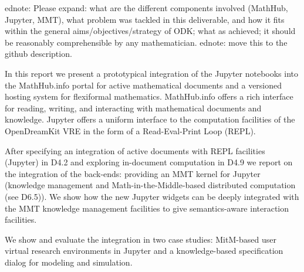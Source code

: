 ednote: Please expand: what are the different components involved (MathHub, Jupyter, MMT), what problem was tackled in this deliverable, and how it fits within the general aims/objectives/strategy of ODK; what as achieved; it should be reasonably comprehensible by any mathematician.
ednote: move this to the github description.

In this report we present a prototypical integration of the Jupyter notebooks into the MathHub.info portal for active mathematical documents and a versioned hosting system for flexiformal mathematics.
MathHub.info offers a rich interface for reading, writing, and interacting with mathematical documents and knowledge.
Jupyter offers a uniform interface to the computation facilities of the OpenDreamKit VRE in the form of a Read-Eval-Print Loop (REPL). 

After specifying an integration of active documents with REPL facilities (Jupyter) in D4.2 and exploring in-document computation in D4.9 we report on the integration of the back-ends: providing an MMT kernel for Jupyter (knowledge management and Math-in-the-Middle-based distributed computation (see D6.5)).
We show how the new Jupyter widgets can be deeply integrated with the MMT knowledge management facilities to give semantics-aware interaction facilities.

We show and evaluate the integration in two case studies: MitM-based user virtual research environments in Jupyter and a knowledge-based specification dialog for modeling and simulation. 


